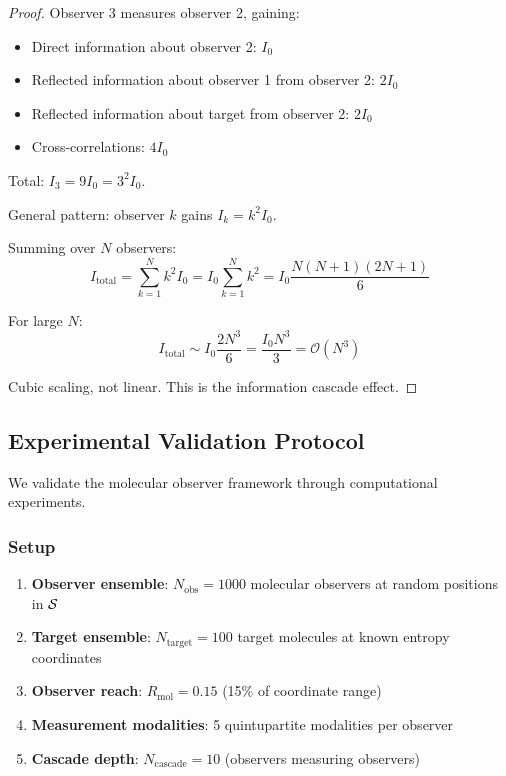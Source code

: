 \begin{theorem}
\begin{proof}
Observer 3 measures observer 2, gaining:
\begin{itemize}
\item Direct information about observer 2: $I_0$
\item Reflected information about observer 1 from observer 2: $2I_0$
\item Reflected information about target from observer 2: $2I_0$
\item Cross-correlations: $4I_0$
\end{itemize}
Total: $I_3 = 9I_0 = 3^2 I_0$.

General pattern: observer $k$ gains $I_k = k^2 I_0$.

Summing over $N$ observers:
\begin{equation}
I_{\text{total}} = \sum_{k=1}^{N} k^2 I_0 = I_0 \sum_{k=1}^{N} k^2 = I_0 \frac{N(N+1)(2N+1)}{6}
\end{equation}

For large $N$:
\begin{equation}
I_{\text{total}} \sim I_0 \frac{2N^3}{6} = \frac{I_0 N^3}{3} = \mathcal{O}(N^3)
\end{equation}

Cubic scaling, not linear. This is the information cascade effect.
\end{proof}

\subsection{Experimental Validation Protocol}

We validate the molecular observer framework through computational experiments.

\subsubsection{Setup}

\begin{enumerate}
\item \textbf{Observer ensemble}: $N_{\text{obs}} = 1000$ molecular observers at random positions in $\mathcal{S}$
\item \textbf{Target ensemble}: $N_{\text{target}} = 100$ target molecules at known entropy coordinates
\item \textbf{Observer reach}: $R_{\text{mol}} = 0.15$ (15\% of coordinate range)
\item \textbf{Measurement modalities}: 5 quintupartite modalities per observer
\item \textbf{Cascade depth}: $N_{\text{cascade}} = 10$ (observers measuring observers)
\end{enumerate}


\end{theorem}
